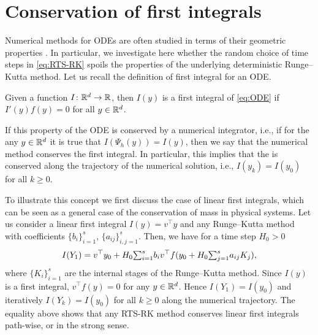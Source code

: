 \documentclass[10pt]{article}
\begin{document}

\section{Conservation of first integrals}\label{sec:GeomProperties}
Numerical methods for ODEs are often studied in terms of their geometric properties \cite{HLW06}. In particular, we investigate here whether the random choice of time steps in \eqref{eq:RTS-RK} spoils the properties of the underlying deterministic Runge--Kutta method. Let us recall the definition of first integral for an ODE.
\begin{definition} Given a function $I\colon\mathbb{R}^d\to\mathbb{R}$, then $I(y)$ is a first integral of \eqref{eq:ODE} if $I'(y)f(y) = 0$ for all $y \in \mathbb{R}^d$. 
\end{definition}	
If this property of the ODE is conserved by a numerical integrator, i.e., if for the any $y\in\mathbb{R}^d$ it is true that $I(\Psi_h(y)) = I(y)$, then we say that the numerical method conserves the first integral. In particular, this implies that the  is conserved along the trajectory of the numerical solution, i.e., $I(y_k) = I(y_0)$ for all $k\geq 0$.
	
\begin{example} To illustrate this concept we first discuss the case of linear first integrals, which can be seen as a general case of the conservation of mass in physical systems. Let us consider a linear first integral $I(y) = v^\top y$ and any Runge--Kutta method with coefficients $\{b_i\}_{i=1}^s$, $\{a_{ij}\}_{i,j=1}^s$. Then, we have for a time step $H_0 > 0$
	\begin{equation}
		I(Y_1) = v^\top y_0 + H_0 {\textstyle\sum}_{i=1}^s b_iv^\top f(y_0 + H_0{\textstyle\sum}_{j=1}^{s} a_{ij}K_j),
	\end{equation}
	where $\{K_i\}_{i=1}^s$ are the internal stages of the Runge--Kutta method. Since $I(y)$ is a first integral, $v^\top f(y) = 0$ for any $y \in \mathbb{R}^d$. Hence $I(Y_1)  = I(y_0)$ and iteratively $I(Y_k) = I(y_0)$ for all $k \geq 0$ along the numerical trajectory. The equality above shows that any RTS-RK method conserves linear first integrals path-wise, or in the strong sense. 
\end{example}
\end{document}
